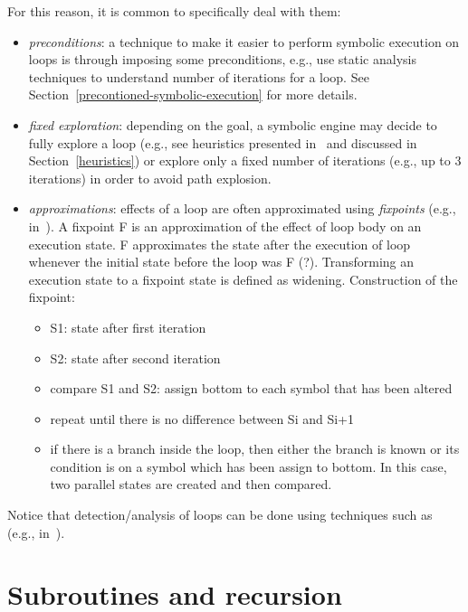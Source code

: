 For this reason, it is common to specifically deal with them:
\begin{itemize}

  \item {\em preconditions}: a technique to make it easier to perform symbolic execution on loops is through imposing some preconditions, e.g., use static analysis techniques to understand number of iterations for a loop. See Section~\ref{precontioned-symbolic-execution} for more details.

  \item {\em fixed exploration}: depending on the goal, a symbolic engine may decide to fully explore a loop (e.g., see heuristics presented in~\cite{AEG-NDSS11} and discussed in Section~\ref{heuristics}) or explore only a fixed number of iterations (e.g., up to 3 iterations) in order to avoid path explosion.

  \item {\em approximations}: effects of a loop are often approximated using {\em fixpoints} (e.g., in~\cite{KKM-USEC05,BNS-SP06,CFB-ACSAC06}). A fixpoint F is an approximation of the effect of loop body on an execution state. F approximates the state after the execution of loop whenever the initial state before the loop was F (?). Transforming an execution state to a fixpoint state is defined as widening. Construction of the fixpoint:
  \begin{itemize}
    \item S1: state after first iteration
    \item S2: state after second iteration
    \item compare S1 and S2: assign bottom to each symbol that has been altered
    \item repeat until there is no difference between Si and Si+1
    \item if there is a branch inside the loop, then either the branch is known or its condition is on a symbol which has been assign to bottom. In this case, two parallel states are created and then compared.
  \end{itemize}

\end{itemize}

Notice that detection/analysis of loops can be done using techniques such as~\cite{SGL-TOPLAS96} (e.g., in~\cite{CFB-ACSAC06}).

\section{Subroutines and recursion}
\label{se:recursion}











